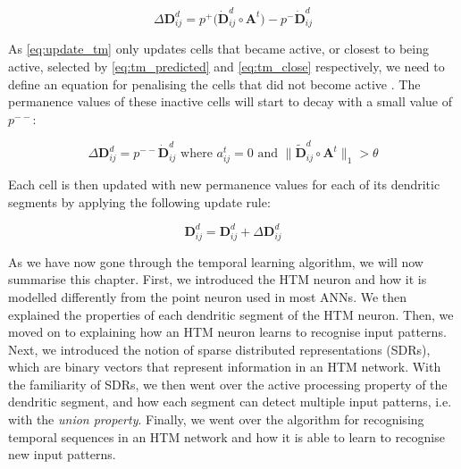 \begin{equation}
    \label{eq:update_tm}
    \Delta \boldsymbol{D}^{d}_{ij} = p^+\Big(\dot{\boldsymbol{D}}^{d}_{ij} \circ \boldsymbol{A}^{t}\Big) - p^-\dot{\boldsymbol{D}}^{d}_{ij}
\end{equation}


As \autoref{eq:update_tm} only updates cells that became active, or closest to being active, selected by  \autoref{eq:tm_predicted} and \autoref{eq:tm_close} respectively, we need to define an equation for penalising the cells that did not become active \cite{10.3389/fncir.2016.00023}. The permanence values of these inactive cells will start to decay with a small value of $p^{--}$:

\begin{equation}
        \Delta \boldsymbol{D}^{d}_{ij} = p^{--}\dot{\boldsymbol{D}}^{d}_{ij} \text{ where } a_{ij}^t = 0 \text{ and } \Big\| \tilde{\boldsymbol{D}}^{d}_{ij} \circ \boldsymbol{A}^{t} \Big\|_1 > \theta
\end{equation}

Each cell is then updated with new permanence values for each of its dendritic segments by applying the following update rule:

\begin{equation}
    \boldsymbol{D}^{d}_{ij} = \boldsymbol{D}^{d}_{ij} + \Delta \boldsymbol{D}^{d}_{ij}
\end{equation}


As we have now gone through the temporal learning algorithm, we will now summarise this chapter. First, we introduced the HTM neuron and how it is modelled differently from the point neuron used in most ANNs. We then explained the properties of each dendritic segment of the HTM neuron. Then, we moved on to explaining how an HTM neuron learns to recognise input patterns. Next, we introduced the notion of sparse distributed representations (SDRs), which are binary vectors that represent information in an HTM network. With the familiarity of SDRs, we then went over the active processing property of the dendritic segment, and how each segment can detect multiple input patterns, i.e. with the \textit{union property}. Finally, we went over the algorithm for recognising temporal sequences in an HTM network and how it is able to learn to recognise new input patterns. 











\begin{comment}

\begin{figure}[H]
    \centering
    \scalebox{.4}{}
    \caption{Caption}
    \label{fig:my_label}
\end{figure}

\begin{figure}[H]
    \centering
    \scalebox{.2}{}
    \caption{Caption}
    \label{fig:my_label}
\end{figure}
\end{comment}

